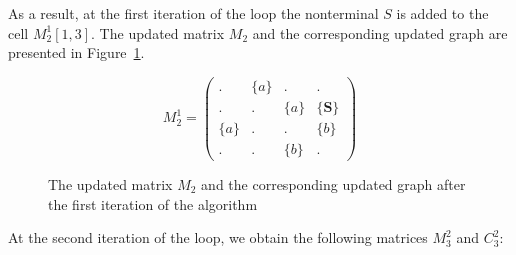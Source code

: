 As a result, at the first iteration of the loop the nonterminal $S$ is added to the cell $M_2^1[1, 3]$. The updated matrix $M_2$ and the corresponding updated graph are presented in Figure~\ref{example:iteration1res}.

\begin{figure}[h]
    \begin{subfigure}[]{0.5\textwidth}
    \centering
    $$
    M_2^1 =
    \begin{pmatrix}
    . & \{a\} & . & .     \\
    . & . & \{a\} & \{\textbf{S}\} \\
    \{a\} & . & . & \{b\} \\
    . & . & \{b\} & .
    \end{pmatrix}
    $$
    \end{subfigure}
    \begin{subfigure}[]{0.4\textwidth}
    \centering
    \end{subfigure}
    \caption{The updated matrix $M_2$ and the corresponding updated graph after the first iteration of the algorithm}
    \label{example:iteration1res}
\end{figure}


At the second iteration of the loop, we obtain the following matrices $M_3^2$ and $C_3^2$:

